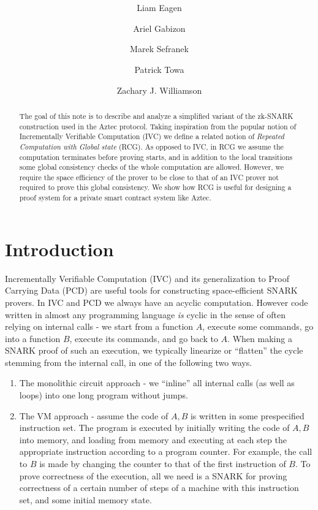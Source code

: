 \documentclass[11pt]{article} %
\title{ \papertitle \\[0.72cm]}
\author[1]{Liam Eagen}
\author[2]{Ariel Gabizon}
\author[3]{Marek Sefranek}
\author[2]{Patrick Towa}
\author[2]{Zachary J. Williamson}
\affil[1]{Alpen Labs}
\affil[2]{Aztec Labs}
\affil[3]{TU Wien}
\begin{document}
    \maketitle
\begin{abstract}
The goal of this note is to describe and analyze a simplified variant of the zk-SNARK construction used in the Aztec protocol.
Taking inspiration from the popular notion of Incrementally Verifiable Computation\cite{ivc} (IVC)
we define a related notion of \emph{Repeated Computation with Global state} (RCG). As opposed to IVC, in RCG we assume the computation terminates before proving starts, and in addition to the local transitions some global consistency checks of the whole computation are allowed. However, we require the space efficiency of the prover to be close to that of an IVC prover not required to prove this global consistency.
We show how RCG is useful for designing a proof system for a private smart contract system like Aztec.
\end{abstract}
\section{Introduction}
Incrementally Verifiable Computation (IVC) \cite{ivc} and its generalization to Proof Carrying Data (PCD) \cite{pcd} are useful tools for constructing space-efficient SNARK provers\cite{BCCT}.
In IVC and PCD we always have an acyclic computation.
However code written in almost any programming language \emph{is} cyclic in the sense of often relying on internal calls - 
we start from a function $A$, execute some commands, go into a function $B$, execute its commands, and go back to $A$.
When making a SNARK proof of such an execution, we typically linearize or ``flatten'' the cycle stemming from  the internal call, in one of the following two ways.
\begin{enumerate}
 \item The monolithic circuit approach - we ``inline'' all internal calls (as well as loops) into one long program without jumps.
 \item The VM approach - assume the code of $A,B$ is written in some prespecified instruction set. The program is executed by initially writing the code of $A,B$ into memory, and loading from memory and executing at each step the appropriate instruction according to a program counter. For example, the call to $B$ is made by changing the counter to that of the  first instruction of $B$. To prove correctness of the execution, all we need is a SNARK for proving correctness of a certain number of steps of a machine with this instruction set, and some initial memory state.
\end{enumerate}
\end{document}
